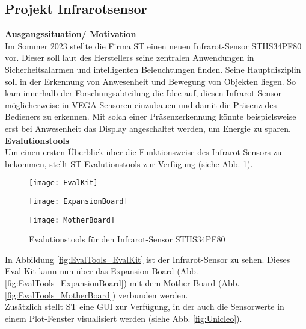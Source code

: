 \documentclass[
	letterpaper, %
	10pt, %
]{CSUniSchoolLabReport}
\begin{document}
\begin{spacing}{1.6}
\newpage
\section{Projekt Infrarotsensor}
\textbf{Ausgangssituation/ Motivation\\}
Im Sommer 2023 stellte die Firma ST einen neuen Infrarot-Sensor STHS34PF80 vor. Dieser soll laut des Herstellers seine zentralen Anwendungen in Sicherheitsalarmen und intelligenten Beleuchtungen finden. Seine Hauptdisziplin soll in der Erkennung von Anwesenheit und Bewegung von Objekten liegen. So kam innerhalb der Forschungsabteilung die Idee auf, diesen Infrarot-Sensor möglicherweise in VEGA-Sensoren einzubauen und damit die Präsenz des Bedieners zu erkennen. Mit solch einer Präsenzerkennung könnte beispielsweise erst bei Anwesenheit das Display angeschaltet werden, um Energie zu sparen.\\

\textbf{Evalutionstools\\}
Um einen ersten Überblick über die Funktionsweise des Infrarot-Sensors zu bekommen, stellt ST Evalutionstools zur Verfügung (siehe Abb. \ref{fig:EvalTools}). 

\begin{figure}[H]
    \begin{center}
    \begin{minipage}[t]{0.32\textwidth}
        \centering
        \texttt{[image: EvalKit]}
        \label{fig:EvalTools_EvalKit}
    \end{minipage}
    \begin{minipage}[t]{0.32\textwidth}
        \centering
        \texttt{[image: ExpansionBoard]}
        \label{fig:EvalTools_ExpansionBoard}
    \end{minipage}
    \begin{minipage}[t]{0.32\textwidth}
        \centering
        \texttt{[image: MotherBoard]}
        \label{fig:EvalTools_MotherBoard}
    \end{minipage}
        \caption{Evalutionstools für den Infrarot-Sensor STHS34PF80}
        \label{fig:EvalTools}
    \end{center}
\end{figure}

In Abbildung \ref{fig:EvalTools_EvalKit} ist der Infrarot-Sensor zu sehen. Dieses Eval Kit kann nun über das Expansion Board (Abb. \ref{fig:EvalTools_ExpansionBoard}) mit dem Mother Board (Abb. \ref{fig:EvalTools_MotherBoard}) verbunden werden.\\
Zusätzlich stellt ST eine GUI zur Verfügung, in der auch die Sensorwerte in einem Plot-Fenster visualisiert werden (siehe Abb. \ref{fig:Unicleo}).\\


\end{spacing}
\end{document}
